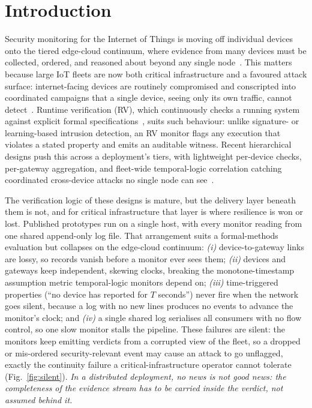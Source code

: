 \documentclass[runningheads]{llncs}
\begin{document}
\section{Introduction}
\label{sec:intro}
Security monitoring for the Internet of Things is moving off individual devices onto the
tiered edge-cloud continuum, where evidence from many devices must be collected, ordered,
and reasoned about beyond any single node~\cite{shi2016edge}. This matters because large
IoT fleets are now both critical infrastructure and a favoured attack surface:
internet-facing devices are routinely compromised and conscripted into coordinated
campaigns that a single device, seeing only its own traffic, cannot
detect~\cite{stellios2018iot,cavalli2024iotsec}. Runtime verification (RV), which
continuously checks a running system against explicit formal
specifications~\cite{rvsurvey,bartocci2018introduction}, suits such behaviour: unlike
signature- or learning-based intrusion detection, an RV monitor flags any execution that
violates a stated property and emits an auditable witness. Recent hierarchical designs
push this across a deployment's tiers, with lightweight per-device checks, per-gateway
aggregation, and fleet-wide temporal-logic correlation catching coordinated cross-device
attacks no single node can see~\cite{ares2026,csr2026}.

The verification logic of these designs is mature, but the delivery layer beneath
them is not, and for critical infrastructure that layer is where resilience is
won or lost. Published prototypes run on a single host, with every monitor reading
from one shared append-only log file. That arrangement suits a formal-methods
evaluation but collapses on the edge-cloud continuum:
\emph{(i)} device-to-gateway links are lossy, so records vanish before a monitor
ever sees them; \emph{(ii)} devices and gateways keep independent, skewing clocks,
breaking the monotone-timestamp assumption metric temporal-logic monitors
depend on; \emph{(iii)} time-triggered properties (``no device has reported for
$T$ seconds'') never fire when the network goes silent, because a log
with no new lines produces no events to advance the monitor's clock; and
\emph{(iv)} a single shared log serialises all consumers with no flow
control, so one slow monitor stalls the pipeline. These failures are silent: the monitors keep emitting
verdicts from a corrupted view of the fleet, so a dropped or mis-ordered
security-relevant event may cause an attack to go unflagged, exactly the
continuity failure a critical-infrastructure operator cannot tolerate
(Fig.~\ref{fig:silent}). \emph{In a distributed deployment, no news is not
good news: the completeness of the evidence stream has to be carried inside the verdict,
not assumed behind it.}
\end{document}
